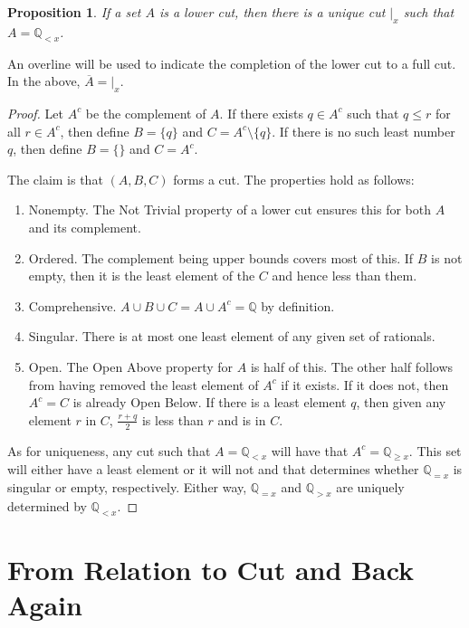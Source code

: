 \documentclass[12pt]{article}
\newtheorem{proposition}{Proposition}[section]
\newcommand{\qcut}[2][x]{\ensuremath{\mathbb{Q}_{#2 #1}}}
\newcommand{\qlt}[1][x]{\qcut[#1]{<}}
\newcommand{\qeq}[1][x]{\qcut[#1]{=}}
\newcommand{\qgt}[1][x]{\qcut[#1]{>}}
\newcommand{\qgeq}[1][x]{\qcut[#1]{\geq}}
\newcommand{\cut}[1][x]{{\vert}_{#1} }
\begin{document}
\begin{proposition}\label{br--lowcutdef}
    If a set $A$ is a lower cut, then there is a unique cut $\cut$ such that $A = \qlt$.
\end{proposition}

An overline will be used to indicate the completion of the lower cut to a full cut. In the above, $\overline{A} = \cut$.

\begin{proof}
    Let $A^c$ be the complement of $A$. If there exists $q \in A^c$ such that $q \leq r$ for all $r \in A^c$, then define $B = \{q\}$ and $C = A^c \setminus \{q\}$. If there is no such least number $q$, then define $B = \{\}$ and $C = A^c$. 

    The claim is that $(A, B, C)$ forms a cut. The properties hold as follows:

    \begin{enumerate}
        \item Nonempty. The Not Trivial property of a lower cut ensures this for both $A$ and its complement. 
        \item Ordered. The complement being upper bounds covers most of this. If $B$ is not empty, then it is the least element of the $C$ and hence less than them. 
        \item Comprehensive. $A \cup B \cup C = A \cup A^c = \mathbb{Q}$ by definition. 
        \item Singular. There is at most one least element of any given set of rationals. 
        \item Open. The Open Above property for $A$ is half of this. The other half follows from having removed the least element of $A^c$ if it exists. If it does not, then $A^c = C$ is already Open Below. If there is a least element $q$, then given any element $r$ in $C$, $\frac{r+q}{2}$ is less than $r$ and is in $C$. 
    \end{enumerate}

    As for uniqueness, any cut such that $A = \qlt$ will have that $A^c = \qgeq$. This set will either have a least element or it will not and that determines whether $\qeq$ is singular or empty, respectively. Either way, $\qeq$ and $\qgt$ are uniquely determined by $\qlt$. 
\end{proof}


\section{From Relation to Cut and Back Again}
\end{document}

